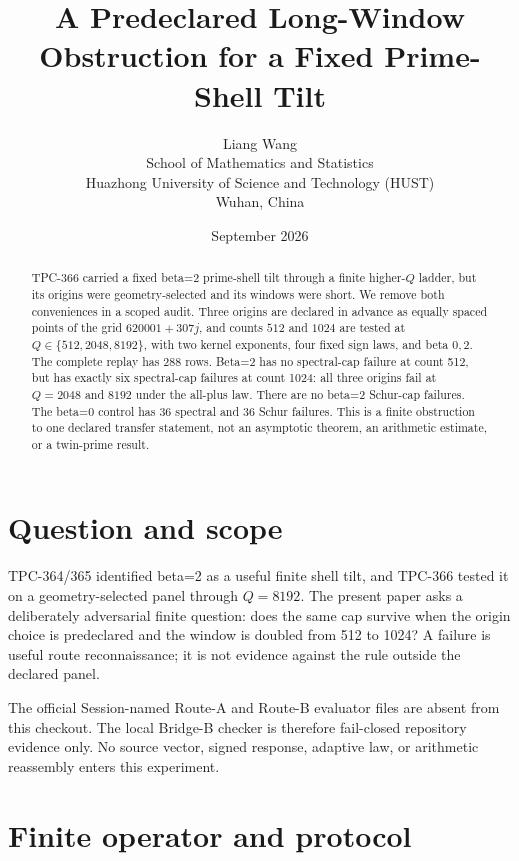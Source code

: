 \documentclass[10pt]{article}
\title{A Predeclared Long-Window Obstruction for a Fixed Prime-Shell Tilt}
\author{Liang Wang\\
\small School of Mathematics and Statistics\\
\small Huazhong University of Science and Technology (HUST)\\
\small Wuhan, China}
\date{September 2026}
\begin{document}
\maketitle

\begin{abstract}
TPC-366 carried a fixed beta=2 prime-shell tilt through a finite higher-$Q$
ladder, but its origins were geometry-selected and its windows were short.
We remove both conveniences in a scoped audit.  Three origins are declared in
advance as equally spaced points of the grid $620001+307j$, and counts $512$
and $1024$ are tested at $Q\in\{512,2048,8192\}$, with two kernel
exponents, four fixed sign laws, and beta $0,2$.  The complete replay has 288
rows.  Beta=2 has no spectral-cap failure at count 512, but has exactly six
spectral-cap failures at count 1024: all three origins fail at $Q=2048$ and
$8192$ under the all-plus law.  There are no beta=2 Schur-cap failures.  The
beta=0 control has 36 spectral and 36 Schur failures.  This is a finite
obstruction to one declared transfer statement, not an asymptotic theorem,
an arithmetic estimate, or a twin-prime result.
\end{abstract}

\section{Question and scope}

TPC-364/365 identified beta=2 as a useful finite shell tilt, and TPC-366
tested it on a geometry-selected panel through $Q=8192$.  The present paper
asks a deliberately adversarial finite question: does the same cap survive
when the origin choice is predeclared and the window is doubled from 512 to
1024?  A failure is useful route reconnaissance; it is not evidence against
the rule outside the declared panel.

The official Session-named Route-A and Route-B evaluator files are absent
from this checkout.  The local Bridge-B checker is therefore fail-closed
repository evidence only.  No source vector, signed response, adaptive law,
or arithmetic reassembly enters this experiment.

\section{Finite operator and protocol}
\end{document}
